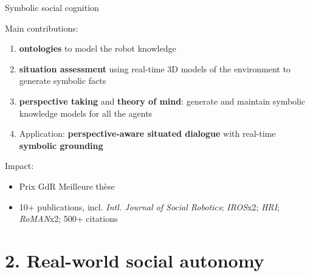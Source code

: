 \documentclass[xcolor=table]{beamer}
\begin{document}
\begin{frame}{Symbolic social cognition}

Main contributions:

    \begin{enumerate}
        \item \textbf{ontologies} to model the robot knowledge
        \item \textbf{situation assessment} using real-time 3D models of the
            environment to generate symbolic facts
        \item \textbf{perspective taking} and \textbf{theory of mind}: generate and
            maintain symbolic knowledge models for all the agents
        \item Application: \textbf{perspective-aware situated dialogue} with real-time \textbf{symbolic
            grounding}
    \end{enumerate}

Impact:
    \begin{itemize}
        \item Prix GdR Meilleure thèse
        \item 10+ publications, incl. \emph{Intl. Journal of Social Robotics};
            \emph{IROS}x2; \emph{HRI}; \emph{RoMAN}x2; 500+ citations
    \end{itemize}
\end{frame}

\section{2. Real-world social autonomy}
\end{document}
